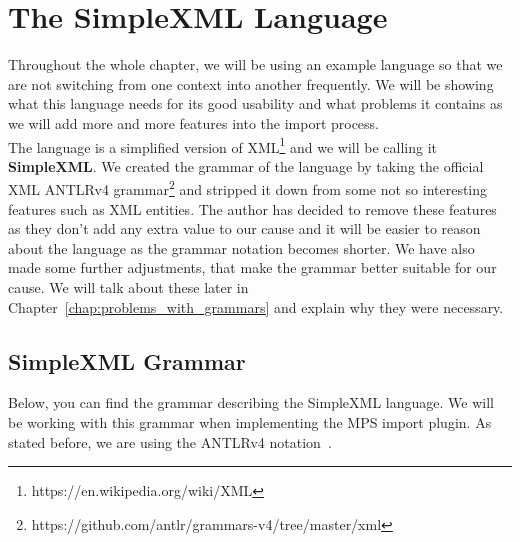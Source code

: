 \section{The SimpleXML Language}

Throughout the whole chapter, we will be using an example language so that we are not switching from one context into another frequently.
We will be showing what this language needs for its good usability and what problems it contains as we will add more and more features into the import process.
\\

The language is a simplified version of XML\footnote{https://en.wikipedia.org/wiki/XML} and we will be calling it \textbf{SimpleXML}.
We created the grammar of the language by taking the official XML ANTLRv4 grammar\footnote{https://github.com/antlr/grammars-v4/tree/master/xml} and stripped it down from some not so interesting features such as XML entities.
The author has decided to remove these features as they don't add any extra value to our cause and it will be easier to reason about the language as the grammar notation becomes shorter.
We have also made some further adjustments, that make the grammar better suitable for our cause.
We will talk about these later in Chapter~\ref{chap:problems_with_grammars} and explain why they were necessary.

\newpage

\subsection{SimpleXML Grammar}
\label{chap:simplexml_grammar}

Below, you can find the grammar describing the SimpleXML language.
We will be working with this grammar when implementing the MPS import plugin.
As stated before, we are using the ANTLRv4 notation~\cite{ANTLR4reference}.

